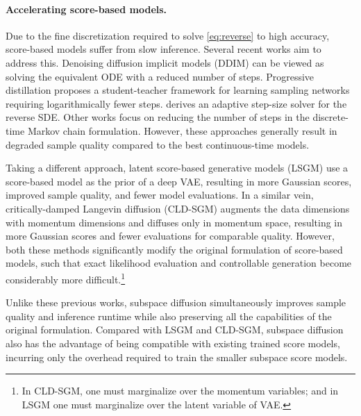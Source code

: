 \documentclass{article}
\begin{document}
\paragraph{\textbf{Accelerating score-based models.}} Due to the fine discretization required to solve \eqref{eq:reverse} to high accuracy, score-based models suffer from slow inference. Several recent works aim to address this. Denoising diffusion implicit models (DDIM) \cite{song2020denoising} can be viewed as solving the equivalent ODE with a reduced number of steps. Progressive distillation \cite{salimans2021progressive} proposes a student-teacher framework for learning sampling networks requiring logarithmically fewer steps. \cite{jolicoeur2021gotta} derives an adaptive step-size solver for the reverse SDE. Other works \cite{nichol2021improved,dhariwal2021diffusion,kong2021fast,watson2021learning,san2021noise,lam2021bilateral,bao2022analytic} focus on reducing the number of steps in the discrete-time Markov chain formulation. However, these approaches generally result in degraded sample quality compared to the best continuous-time models.

Taking a different approach, latent score-based generative models (LSGM) \cite{vahdat2021score} use a score-based model as the prior of a deep VAE, resulting in more Gaussian scores, improved sample quality, and fewer model evaluations. In a similar vein, critically-damped Langevin diffusion (CLD-SGM) \cite{dockhorn2021score} augments the data dimensions with momentum dimensions and diffuses only in momentum space, resulting in more Gaussian scores and fewer evaluations for comparable quality. However, both these methods significantly modify the original formulation of score-based models, such that exact likelihood evaluation and controllable generation become considerably more difficult.\footnote{In CLD-SGM, one must marginalize over the momentum variables; and in LSGM one must marginalize over the latent variable of VAE.}

Unlike these previous works, subspace diffusion simultaneously improves sample quality and inference runtime while also preserving all the capabilities of the original formulation. Compared with LSGM and CLD-SGM, subspace diffusion also has the advantage of being compatible with existing trained score models, incurring only the overhead required to train the smaller subspace score models.
\end{document}
